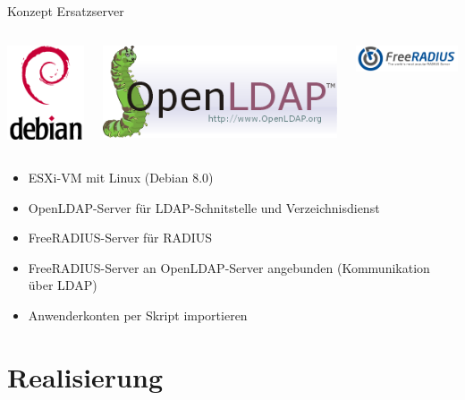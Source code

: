 \documentclass[handout,svgnames]{beamer}
\begin{document}
\begin{frame}{Konzept Ersatzserver}
\begin{columns}[c]
	\begin{column}{0.5cm}
		\includegraphics[scale=0.3]{Bilder/debian-openlogo-100.png}
	\end{column}
	\begin{column}{1.5cm}
		\includegraphics[scale=0.25]{Bilder/OpenLDAP-logo.png}
	\end{column}
	\begin{column}{2.5cm}
		\includegraphics[width=3.5cm]{Bilder/Freeradius_logo.png} 
	\end{column}
\end{columns}
\begin{itemize}
	\item ESXi-VM mit Linux (Debian 8.0)
	\item OpenLDAP-Server für LDAP-Schnitstelle und Verzeichnisdienst
	\item FreeRADIUS-Server für RADIUS
	\item FreeRADIUS-Server an OpenLDAP-Server angebunden (Kommunikation über LDAP)
	\item Anwenderkonten per Skript importieren
\end{itemize}
\end{frame}


\section{Realisierung}
\end{document}

